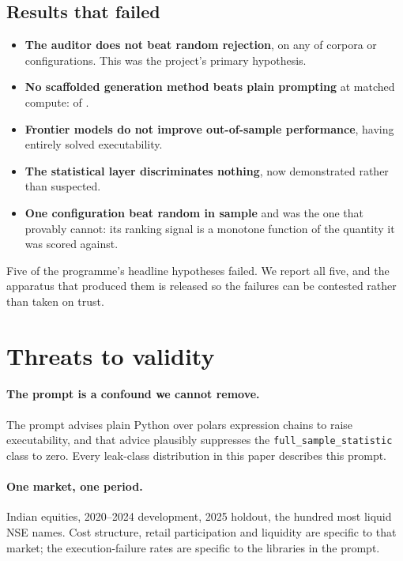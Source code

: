 \documentclass[11pt,a4paper]{article}
\begin{document}
\subsection{Results that failed}

\begin{itemize}
\item \textbf{The auditor does not beat random rejection}, on any of \pgmNullCorpora{} corpora or
  \pgmNullCombos{} configurations. This was the project's primary hypothesis.
\item \textbf{No scaffolded generation method beats plain prompting} at matched compute:
  \pgmScaffoldWins{} of \pgmScaffoldArms{}.
\item \textbf{Frontier models do not improve out-of-sample performance}, having entirely solved
  executability.
\item \textbf{The statistical layer discriminates nothing}, now demonstrated rather than suspected.
\item \textbf{One configuration beat random in sample} and was the one that provably cannot: its
  ranking signal is a monotone function of the quantity it was scored against.
\end{itemize}

\begin{finding}
Five of the programme's headline hypotheses failed. We report all five, and the apparatus that
produced them is released so the failures can be contested rather than taken on trust.
\end{finding}

\section{Threats to validity}
\label{sec:threats}

\paragraph{The prompt is a confound we cannot remove.} The prompt advises plain Python over polars
expression chains to raise executability, and that advice plausibly suppresses the
\texttt{full\_sample\_statistic} class to zero. Every leak-class distribution in this paper
describes this prompt.

\paragraph{One market, one period.} Indian equities, 2020--2024 development, 2025 holdout, the
hundred most liquid NSE names. Cost structure, retail participation and liquidity are specific to
that market; the execution-failure rates are specific to the libraries in the prompt.
\end{document}
